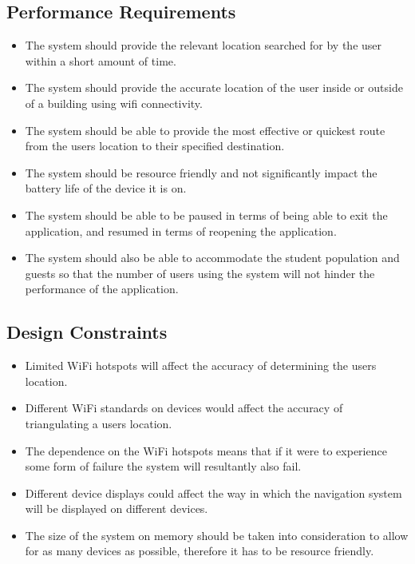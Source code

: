 \documentclass{article}
\begin{document}
		\subsection{Performance Requirements}\label{sec:performance-requirements}
			\begin{itemize}
			\small
			\item The system should provide the relevant location searched for by the user within a short amount of time.
			\item The system should provide the accurate location of the user inside or outside of a building using wifi connectivity.
			\item The system should be able to provide the most effective or quickest route from the users location to their specified destination.
			\item The system should be resource friendly and not significantly impact the battery life of the device it is on.
			\item The system should be able to be paused in terms of being able to exit the application, and resumed in terms of reopening the application.
			\item The system should also be able to accommodate the student population and guests so that the number of users using the system will not hinder the performance of the application.
			\end{itemize}
		

		\subsection{Design Constraints}\label{sec:design-constraints}
			\begin{itemize}
			\small
			\item Limited WiFi hotspots will affect the accuracy of determining the users location.
			\item Different WiFi standards on devices would affect the accuracy of triangulating a users location.
			\item The dependence on the WiFi hotspots means that if it were to experience some form of failure the system will resultantly also fail.
			\item Different device displays could affect the way in which the navigation system will be displayed on different devices.
			\item The size of the system on memory should be taken into consideration to allow for as many devices as possible, therefore it has to be resource friendly.
			\end{itemize}
		
\end{document}
